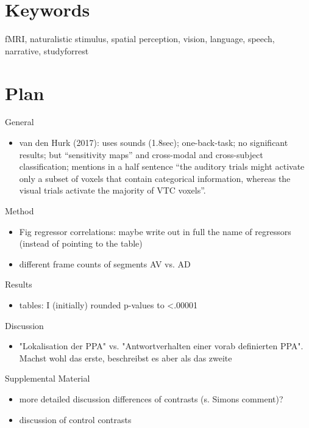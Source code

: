\documentclass[english]{article}
\begin{document}
\section*{Keywords}
fMRI, naturalistic stimulus, spatial perception, vision, language, speech,
narrative, studyforrest

\pagebreak[4]


\section*{Plan}


\noindent General
\begin{itemize}
    \item van den Hurk (2017): uses sounds (1.8sec); one-back-task; no
        significant results; but ``sensitivity maps'' and cross-modal and
        cross-subject classification; mentions in a half sentence ``the auditory
        trials might activate only a subset of voxels that contain categorical
        information, whereas the visual trials activate the majority of VTC
        voxels''.
\end{itemize}

\noindent Method

\begin{itemize}
    \item Fig regressor correlations: maybe write out in full the name of
        regressors (instead of pointing to the table)
    \item different frame counts of segments AV vs. AD
\end{itemize}


\noindent Results

\begin{itemize}
    \item tables: I (initially) rounded p-values to <.00001
\end{itemize}

\noindent Discussion
\begin{itemize}
    \item "Lokalisation der PPA" vs. "Antwortverhalten einer vorab definierten
        PPA". Machst wohl das erste, beschreibst es aber als das zweite
\end{itemize}


\noindent Supplemental Material
\begin{itemize}
    \item more detailed discussion differences of contrasts (s. Simons comment)?
    \item discussion of control contrasts
\end{itemize}
\end{document}
